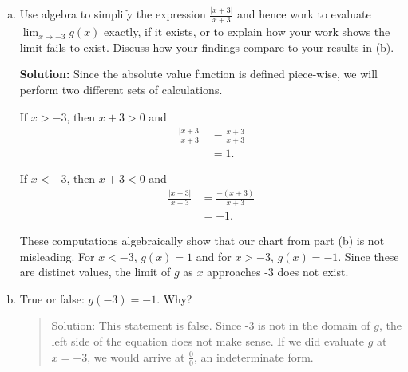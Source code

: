 \begin{enumerate}[(a)]
\item  Use algebra to simplify the expression $\frac{|x+3|}{x+3}$ and hence work to evaluate $\lim_{x \rightarrow -3} g(x)$ exactly, if it exists, or to explain how your work shows the limit fails to exist.  Discuss how your findings compare to your results in (b).

{\bf Solution:}  Since the absolute value function is defined piece-wise, we will perform two different sets of calculations.

If $x > -3$, then $x + 3 > 0$ and
\begin{align*}
\frac{|x+3|}{x+3} & = \frac{x+3}{x+3}\\
& = 1.
\end{align*}

If $x < -3$, then $x + 3 < 0$ and
\begin{align*}
\frac{|x+3|}{x+3} & = \frac{-(x+3)}{x+3} \\
& = -1.
\end{align*}

These computations algebraically show that our chart from part (b) is not misleading.  For $x < -3$, $g(x) = 1$ and for $x > -3$, $g(x) = -1$.  Since these are distinct values, the limit of $g$ as $x$ approaches -3 does not exist.

\vspace{.5in}

\item  True or false: $g(-3) = -1$.  Why?

\begin{quote} %
Solution:  This statement is false.  Since -3 is not in the domain of $g$, the left side of the equation does not make sense.  If we did evaluate $g$ at $x = -3$, we would arrive at $\frac{0}{0}$, an indeterminate form.
\end{quote}

\vfill


\end{enumerate}
